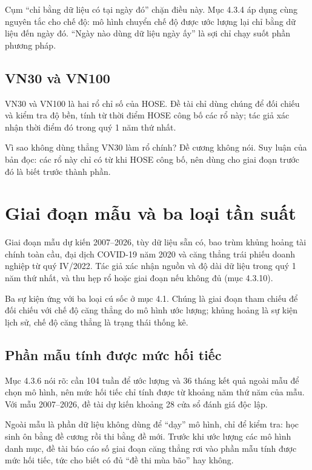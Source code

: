 Cụm “chỉ bằng dữ liệu có tại ngày đó” chặn điều này. Mục 4.3.4 áp dụng cùng nguyên tắc cho chế độ: mô hình chuyển chế độ được ước lượng lại chỉ bằng dữ liệu đến ngày đó. “Ngày nào dùng dữ liệu ngày ấy” là sợi chỉ chạy suốt phần phương pháp.

\subsection{VN30 và VN100}

VN30 và VN100 là hai rổ chỉ số của HOSE. Đề tài chỉ dùng chúng để đối chiếu và kiểm tra độ bền, tính từ thời điểm HOSE công bố các rổ này; tác giả xác nhận thời điểm đó trong quý 1 năm thứ nhất.

Vì sao không dùng thẳng VN30 làm rổ chính? Đề cương không nói. Suy luận của bản đọc: các rổ này chỉ có từ khi HOSE công bố, nên dùng cho giai đoạn trước đó là biết trước thành phần.

\section{Giai đoạn mẫu và ba loại tần suất}

Giai đoạn mẫu dự kiến 2007--2026, tùy dữ liệu sẵn có, bao trùm khủng hoảng tài chính toàn cầu, đại dịch COVID-19 năm 2020 và căng thẳng trái phiếu doanh nghiệp từ quý IV/2022. Tác giả xác nhận nguồn và độ dài dữ liệu trong quý 1 năm thứ nhất, và thu hẹp rổ hoặc giai đoạn nếu không đủ (mục 4.3.10).

Ba sự kiện ứng với ba loại cú sốc ở mục 4.1. Chúng là giai đoạn tham chiếu để đối chiếu với chế độ căng thẳng do mô hình ước lượng; khủng hoảng là sự kiện lịch sử, chế độ căng thẳng là trạng thái thống kê.

\subsection{Phần mẫu tính được mức hối tiếc}

Mục 4.3.6 nói rõ: cần 104 tuần để ước lượng và 36 tháng kết quả ngoài mẫu để chọn mô hình, nên mức hối tiếc chỉ tính được từ khoảng năm thứ năm của mẫu. Với mẫu 2007--2026, đề tài dự kiến khoảng 28 cửa sổ đánh giá độc lập.

Ngoài mẫu là phần dữ liệu không dùng để “dạy” mô hình, chỉ để kiểm tra: học sinh ôn bằng đề cương rồi thi bằng đề mới. Trước khi ước lượng các mô hình danh mục, đề tài báo cáo số giai đoạn căng thẳng rơi vào phần mẫu tính được mức hối tiếc, tức cho biết có đủ “đề thi mùa bão” hay không.

